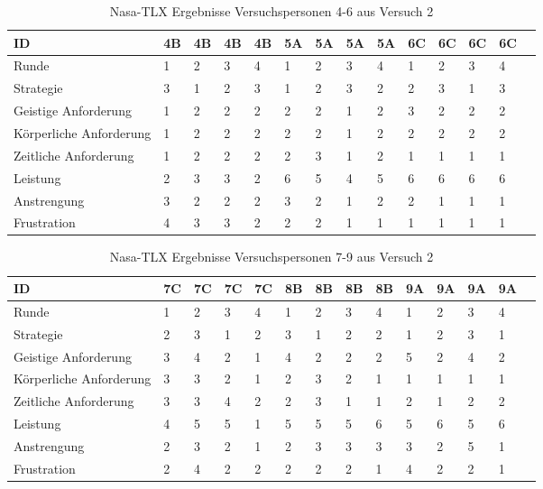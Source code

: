 \documentclass[12pt,a4paper]{scrartcl}
\begin{document}
\begin{appendix}
\begin{table}
\bigskip\bigskip  %
\caption{Nasa-TLX Ergebnisse Versuchspersonen 4-6 aus Versuch 2}

\smallskip
\begin{tabular}{|p{6cm}| p{0.8cm} | p{0.8cm} | p{0.8cm} | p{0.8cm} || p{0.8cm} | p{0.8cm} | p{0.8cm} | p{0.8cm} || p{0.8cm} | p{0.8cm} | p{0.8cm} | p{0.8cm} | p{} | }
\hline 
ID & 4B & 4B & 4B & 4B & 5A & 5A & 5A & 5A & 6C & 6C & 6C & 6C \\ \hline \hline
Runde & 1 & 2 & 3 & 4 & 1 & 2 & 3 & 4 & 1 & 2 & 3 & 4 \\ \hline
	Strategie & 3 & 1 & 2 & 3 & 1 & 2 & 3 & 2 & 2 & 3 & 1 & 3 \\\hline \hline
	Geistige Anforderung & 1 & 2 & 2 & 2 & 2 & 2 & 1 & 2 & 3 & 2 & 2 & 2 \\ \hline
	Körperliche Anforderung & 1 & 2 & 2 & 2 & 2 & 2 & 1 & 2 & 2 & 2 & 2 & 2 \\ \hline
	Zeitliche Anforderung & 1 & 2 & 2 & 2 & 2 & 3 & 1 & 2 & 1 & 1 & 1 & 1 \\ \hline
	Leistung & 2 & 3 & 3 & 2 & 6 & 5 & 4 & 5 & 6 & 6 & 6 & 6 \\ \hline
	Anstrengung & 3 & 2 & 2 & 2 & 3 & 2 & 1 & 2 & 2 & 1 & 1 & 1 \\ \hline
	Frustration & 4 & 3 & 3 & 2 & 2 & 2 & 1 & 1 & 1 & 1 & 1 & 1 \\ \hline
\end{tabular}
\end{table}

\begin{table}
\caption{Nasa-TLX Ergebnisse Versuchspersonen 7-9 aus Versuch 2}

\smallskip
\begin{tabular}{|p{6cm}| p{0.8cm} | p{0.8cm} | p{0.8cm} | p{0.8cm} || p{0.8cm} | p{0.8cm} | p{0.8cm} | p{0.8cm} || p{0.8cm} | p{0.8cm} | p{0.8cm} | p{0.8cm} | p{} | }
\hline
	ID & 7C & 7C & 7C & 7C & 8B & 8B & 8B & 8B & 9A & 9A & 9A & 9A \\ \hline \hline
	Runde & 1 & 2 & 3 & 4 & 1 & 2 & 3 & 4 & 1 & 2 & 3 & 4 \\ \hline
	Strategie & 2 & 3 & 1 & 2 & 3 & 1 & 2 & 2 & 1 & 2 & 3 & 1 \\ \hline \hline
	Geistige Anforderung & 3 & 4 & 2 & 1 & 4 & 2 & 2 & 2 & 5 & 2 & 4 & 2 \\ \hline
	Körperliche Anforderung & 3 & 3 & 2 & 1 & 2 & 3 & 2 & 1 & 1 & 1 & 1 & 1 \\ \hline
	Zeitliche Anforderung & 3 & 3 & 4 & 2 & 2 & 3 & 1 & 1 & 2 & 1 & 2 & 2 \\ \hline
	Leistung & 4 & 5 & 5 & 1 & 5 & 5 & 5 & 6 & 5 & 6 & 5 & 6 \\ \hline
	Anstrengung & 2 & 3 & 2 & 1 & 2 & 3 & 3 & 3 & 3 & 2 & 5 & 1 \\ \hline
	Frustration & 2 & 4 & 2 & 2 & 2 & 2 & 2 & 1 & 4 & 2 & 2 & 1 \\ \hline
\end{tabular}


\end{table}
\end{appendix}
\end{document}
